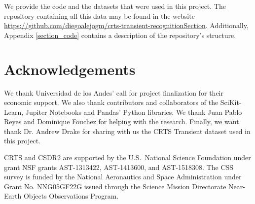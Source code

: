 \documentclass[a4paper,fleqn,usenatbib]{mnras}
\begin{document}
We provide the code and the datasets that were used in this project.
The repository containing all this data may be found in the website \url{https://github.com/diegoalejogm/crts-transient-recognitionSection}. Additionally, Appendix \ref{section_code} contains a description of the
repository's structure.





\section*{Acknowledgements}

We thank Universidad de los Andes' call for project finalization for their economic support.
We also thank contributors and collaborators of the SciKit-Learn, Jupiter Notebooks and Pandas' Python libraries.
We thank Juan Pablo Reyes and Dominique Fouchez for helping with the research.
Finally, we want thank Dr. Andrew Drake for sharing with us the CRTS Transient dataset used in this project.

CRTS and CSDR2 are supported by the U.S.~National Science 
Foundation under grant NSF grants AST-1313422, AST-1413600, and 
AST-1518308.  The CSS survey is funded by the National Aeronautics
and Space Administration under Grant No. NNG05GF22G issued through
the Science Mission Directorate Near-Earth Objects Observations Program.








\end{document}
